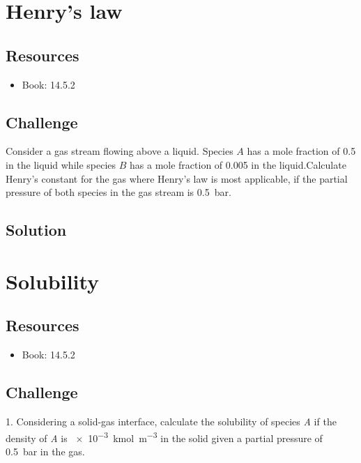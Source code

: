\newpage
\section{Henry's law}

\subsection*{Resources}
\begin{itemize}
    \item Book: 14.5.2
\end{itemize}

\subsection*{Challenge}
Consider a gas stream flowing above a liquid. Species $A$ has a mole fraction of \num{0.5} in the liquid while species $B$ has a mole fraction of \num{0.005} in the liquid.Calculate Henry's constant for the gas where Henry's law is most applicable, if the partial pressure of both species in the gas stream is \SI{0.5}{\bar}.

\subsection*{Solution}




\newpage
\section{Solubility}

\subsection*{Resources}
\begin{itemize}
    \item Book: 14.5.2
\end{itemize}

\subsection*{Challenge}
1. Considering a solid-gas interface, calculate the solubility of species \emph{A} if the density of \emph{A} is \SI{e-3}{\kmol\per\cubic\meter} in the solid given a partial pressure of \SI{0.5}{\bar} in the gas.


